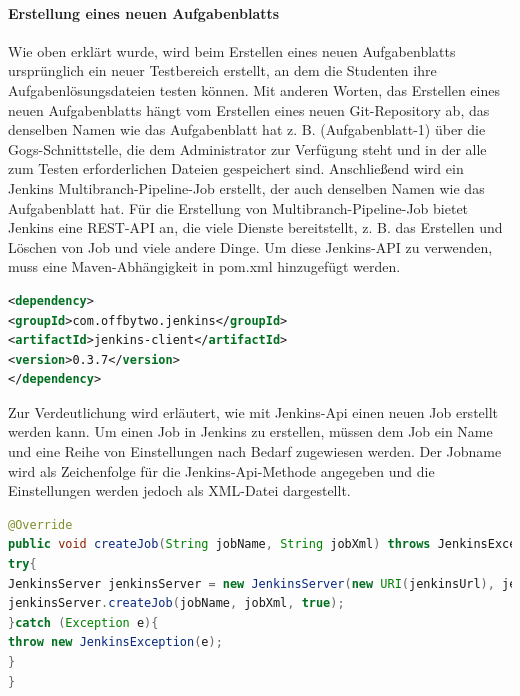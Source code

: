 \documentclass[apaper4,12p]{scrartcl}
\begin{document}
\paragraph{Erstellung eines neuen Aufgabenblatts}
Wie oben erklärt wurde, wird beim Erstellen eines neuen Aufgabenblatts ursprünglich ein neuer Testbereich erstellt, an dem die Studenten ihre Aufgabenlösungsdateien testen können. Mit anderen Worten, das Erstellen eines neuen Aufgabenblatts hängt vom Erstellen eines neuen Git-Repository ab, das denselben Namen wie das Aufgabenblatt hat z. B. (Aufgabenblatt-1) über die Gogs-Schnittstelle, die dem Administrator zur Verfügung steht und in der alle zum Testen erforderlichen Dateien gespeichert sind. Anschließend wird ein Jenkins Multibranch-Pipeline-Job erstellt, der auch denselben Namen wie das Aufgabenblatt hat.
\newline
Für die Erstellung von Multibranch-Pipeline-Job bietet Jenkins eine REST-API an, die viele Dienste bereitstellt, z. B. das Erstellen und Löschen von Job und viele andere Dinge. Um diese Jenkins-API zu verwenden, muss eine Maven-Abhängigkeit in pom.xml hinzugefügt werden.
\begin{lstlisting}[language=XML,caption=pom.xml - Jenkins-Api]
<dependency>
<groupId>com.offbytwo.jenkins</groupId>
<artifactId>jenkins-client</artifactId>
<version>0.3.7</version>
</dependency>
\end{lstlisting}
Zur Verdeutlichung wird erläutert, wie mit Jenkins-Api einen neuen Job erstellt werden kann. Um einen Job in Jenkins zu erstellen, müssen dem Job  ein Name und eine Reihe von Einstellungen nach Bedarf  zugewiesen werden.
\newline
Der Jobname wird als Zeichenfolge für die Jenkins-Api-Methode angegeben und die Einstellungen werden jedoch als XML-Datei dargestellt.
\begin{lstlisting}[language=JAVA,caption=JenkinsServiceImp - createJob]
@Override
public void createJob(String jobName, String jobXml) throws JenkinsException {
try{
JenkinsServer jenkinsServer = new JenkinsServer(new URI(jenkinsUrl), jenkinsUser, jenkinsPassword);
jenkinsServer.createJob(jobName, jobXml, true);
}catch (Exception e){
throw new JenkinsException(e);
} 
}
\end{lstlisting}
\end{document}
